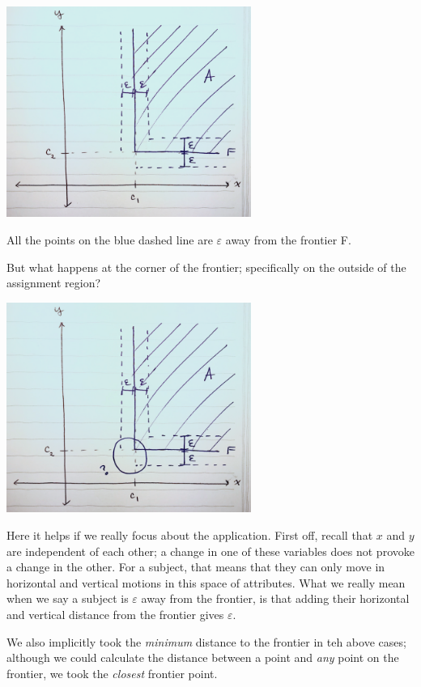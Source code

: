 \documentclass[
]{article}
\begin{document}
\begin{center}
\includegraphics[width=0.6\textwidth]{figs/f2.png}
\end{center}

All the points on the blue dashed line are \(\varepsilon\) away from the
frontier F.

But what happens at the corner of the frontier; specifically on the
outside of the assignment region?

\begin{center}
\includegraphics[width=0.6\textwidth]{figs/f3.png}
\end{center}

Here it helps if we really focus about the application. First off,
recall that \(x\) and \(y\) are independent of each other; a change in
one of these variables does not provoke a change in the other. For a
subject, that means that they can only move in horizontal and vertical
motions in this space of attributes. What we really mean when we say a
subject is \(\varepsilon\) away from the frontier, is that adding their
horizontal and vertical distance from the frontier gives
\(\varepsilon\).

We also implicitly took the \emph{minimum} distance to the frontier in
teh above cases; although we could calculate the distance between a
point and \emph{any} point on the frontier, we took the \emph{closest}
frontier point.
\end{document}
